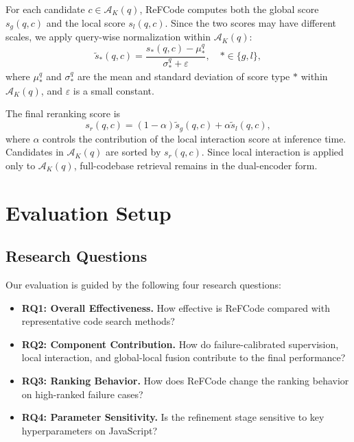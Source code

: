 \documentclass[10pt,conference]{IEEEtran}
\newcommand{\method}{ReFCode}
\begin{document}
For each candidate \(c\in\mathcal{A}_{K}(q)\), \method{} computes both the global score \(s_g(q,c)\) and the local score \(s_l(q,c)\). Since the two scores may have different scales, we apply query-wise normalization within \(\mathcal{A}_{K}(q)\):
\begin{equation}
\widetilde{s}_{*}(q,c)
=
\frac{s_{*}(q,c)-\mu_{*}^{q}}{\sigma_{*}^{q}+\varepsilon},
\quad *\in\{g,l\},
\end{equation}
where \(\mu_{*}^{q}\) and \(\sigma_{*}^{q}\) are the mean and standard deviation of score type \(*\) within \(\mathcal{A}_{K}(q)\), and \(\varepsilon\) is a small constant.

The final reranking score is
\begin{equation}
    s_r(q,c)
    =
    (1-\alpha)\widetilde{s}_{g}(q,c)
    +
    \alpha\widetilde{s}_{l}(q,c),
\end{equation}
where \(\alpha\) controls the contribution of the local interaction score at inference time. Candidates in \(\mathcal{A}_{K}(q)\) are sorted by \(s_r(q,c)\). Since local interaction is applied only to \(\mathcal{A}_{K}(q)\), full-codebase retrieval remains in the dual-encoder form.




\section{Evaluation Setup}

\subsection{Research Questions}

Our evaluation is guided by the following four research questions:
\begin{itemize}
    \item \textbf{RQ1: Overall Effectiveness.} How effective is \method{} compared with representative code search methods?
    \item \textbf{RQ2: Component Contribution.} How do failure-calibrated supervision, local interaction, and global-local fusion contribute to the final performance?
    \item \textbf{RQ3: Ranking Behavior.} How does \method{} change the ranking behavior on high-ranked failure cases?
    \item \textbf{RQ4: Parameter Sensitivity.} Is the refinement stage sensitive to key hyperparameters on JavaScript?
\end{itemize}
\end{document}
